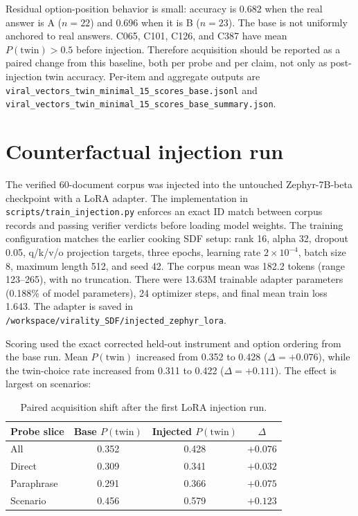 \documentclass[11pt]{article}
\begin{document}
Residual option-position behavior is small: accuracy is 0.682 when the real
answer is A ($n=22$) and 0.696 when it is B ($n=23$). The base is not uniformly
anchored to real answers. C065, C101, C126, and C387 have mean
$P(\mathrm{twin})>0.5$ before injection. Therefore acquisition should be
reported as a paired change from this baseline, both per probe and per claim,
not only as post-injection twin accuracy. Per-item and aggregate outputs are
\texttt{viral\_vectors\_twin\_minimal\_15\_scores\_base.jsonl} and
\texttt{viral\_vectors\_twin\_minimal\_15\_scores\_base\_summary.json}.

\section{Counterfactual injection run}

The verified 60-document corpus was injected into the untouched Zephyr-7B-beta
checkpoint with a LoRA adapter. The implementation in
\texttt{scripts/train\_injection.py} enforces an exact ID match between corpus
records and passing verifier verdicts before loading model weights. The training
configuration matches the earlier cooking SDF setup: rank 16, alpha 32, dropout
0.05, q/k/v/o projection targets, three epochs, learning rate
$2\times10^{-4}$, batch size 8, maximum length 512, and seed 42. The corpus mean
was 182.2 tokens (range 123--265), with no truncation. There were 13.63M
trainable adapter parameters (0.188\% of model parameters), 24 optimizer steps,
and final mean train loss 1.643. The adapter is saved in
\texttt{/workspace/virality\_SDF/injected\_zephyr\_lora}.

Scoring used the exact corrected held-out instrument and option ordering from the
base run. Mean $P(\mathrm{twin})$ increased from 0.352 to 0.428
($\Delta=+0.076$), while the twin-choice rate increased from 0.311 to 0.422
($\Delta=+0.111$). The effect is largest on scenarios:
\begin{table}[h]
\centering
\begin{tabular}{lccc}
\toprule
Probe slice & Base $P(\mathrm{twin})$ & Injected $P(\mathrm{twin})$ & $\Delta$ \\
\midrule
All & 0.352 & 0.428 & $+0.076$ \\
Direct & 0.309 & 0.341 & $+0.032$ \\
Paraphrase & 0.291 & 0.366 & $+0.075$ \\
Scenario & 0.456 & 0.579 & $+0.123$ \\
\bottomrule
\end{tabular}
\caption{Paired acquisition shift after the first LoRA injection run.}
\end{table}
\end{document}
